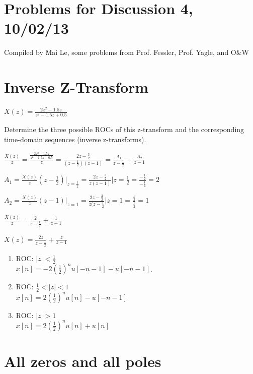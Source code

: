 \documentclass[11pt]{article}
\begin{document}
{\small
\section*{Problems for Discussion 4, 10/02/13}
Compiled by Mai Le, some problems from Prof. Fessler, Prof. Yagle, and O\&W
}
\section{Inverse Z-Transform}
$X(z) = \frac{2z^2-1.5z}{z^2-1.5z+0.5}$

Determine the three possible ROCs of this z-transform and the corresponding time-domain sequences (inverse z-transforms).

{\color{blue}
$\frac{X(z)}{z} = \frac{\frac{2z^2-1.5z}{z^2-1.5z+0.5}}{z} = \frac{2z-\frac{3}{2}}{(z-\frac{1}{2})(z-1)} = \frac{A_1}{z-\frac{1}{2}}+\frac{A_2}{z-1}$

$A_1 = \frac{X(z)}{z}\left(z-\frac{1}{2}\right)\bigg|_{z=\frac{1}{2}}=\frac{2z-\frac{3}{2}}{z(z-1)}\bigg|{z=\frac{1}{2}}=\frac{-\frac{1}{2}}{-\frac{1}{4}} = 2$

$A_2 = \frac{X(z)}{z}\left(z-1 \right)\bigg|_{z=1} = \frac{2z-\frac{3}{2}}{z(z-\frac{1}{2}}\bigg|{z=1} = \frac{\frac{1}{2}}{\frac{1}{2}} = 1 $

$\frac{X(z)}{z} = \frac{2}{z-\frac{1}{2}}+\frac{1}{z-1} $

$X(z) = \frac{2z}{z-\frac{1}{2}}+\frac{z}{z-1} $

\begin{enumerate}
	\item ROC: $|z|<\frac{1}{2}$ \\
	\qquad $x[n]=-2\left(\frac{1}{2}\right)^n u[-n-1]-u[-n-1]$.
	\item ROC: $\frac{1}{2}<|z|<1$ \\
	\qquad $x[n]=2\left(\frac{1}{2}\right)^n u[n] - u[-n-1]$
	\item ROC: $|z|>1$ \\
	\qquad $x[n]=2\left(\frac{1}{2}\right)^nu[n]+u[n]$
\end{enumerate}
}

\section{All zeros and all poles}
\end{document}

